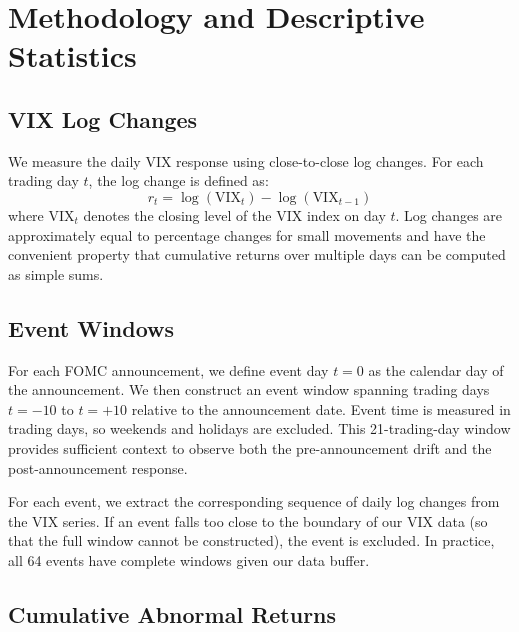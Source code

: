 \section{Methodology and Descriptive Statistics}
\label{sec:methodology}

\subsection{VIX Log Changes}

We measure the daily VIX response using close-to-close log changes. For each trading day $t$, the log change is defined as:
\begin{equation}
    r_t = \log(\text{VIX}_t) - \log(\text{VIX}_{t-1})
    \label{eq:log_change}
\end{equation}
where $\text{VIX}_t$ denotes the closing level of the VIX index on day $t$. Log changes are approximately equal to percentage changes for small movements and have the convenient property that cumulative returns over multiple days can be computed as simple sums.

\subsection{Event Windows}

For each FOMC announcement, we define event day $t = 0$ as the calendar day of the announcement. We then construct an event window spanning trading days $t = -10$ to $t = +10$ relative to the announcement date. Event time is measured in trading days, so weekends and holidays are excluded. This 21-trading-day window provides sufficient context to observe both the pre-announcement drift and the post-announcement response.

For each event, we extract the corresponding sequence of daily log changes from the VIX series. If an event falls too close to the boundary of our VIX data (so that the full window cannot be constructed), the event is excluded. In practice, all 64 events have complete windows given our data buffer.

\subsection{Cumulative Abnormal Returns}

